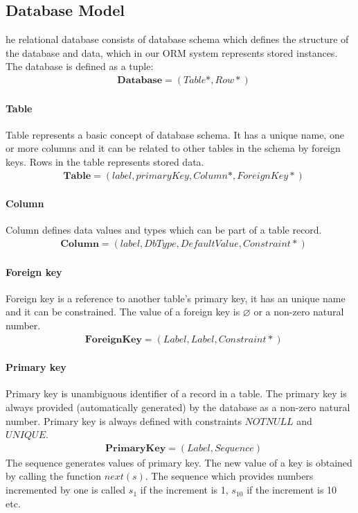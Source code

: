 \documentclass[11pt]{article}
\begin{document}
\subsection{Database Model}
he relational database consists of database schema which defines the structure of the database and data, which in our ORM system represents stored instances. The database is defined as a tuple:
\begin{align*}
&	\mathbf{Database} = ( Table*, Row* )
\end{align*}

\paragraph{Table} Table represents a basic concept of database schema. It has a unique name, one or more columns and it can be related to other tables in the schema by foreign keys. Rows in the table represents stored data.
\begin{align*}
&	\mathbf{Table} = (label, primaryKey, Column*, ForeignKey*)
\end{align*}

\paragraph{Column} Column defines data values and types which can be part of a table record.
\begin{align*}
&	\mathbf{Column} = (label, DbType, DefaultValue, Constraint*) 
\end{align*}

\paragraph{Foreign key} Foreign key is a reference to another table's primary key, it has an unique name and it can be constrained. The value of a foreign key is $\varnothing$ or a non-zero natural number.
\begin{align*}
&	\mathbf{ForeignKey} = (Label, Label, Constraint*) 
\end{align*}


\paragraph{Primary key} Primary key is unambiguous identifier of a record in a table. The primary key is always provided (automatically generated) by the database as a non-zero natural number. Primary key is always defined with constraints $NOTNULL$ and $UNIQUE$. 
\begin{align*}
&	\mathbf{PrimaryKey} =  ( Label, Sequence ) \end{align*}
The sequence generates values of primary key. The new value of a key is obtained by calling the function $next(s)$. The sequence which provides numbers incremented by one is called $s_1$ if the increment is 1, $s_{10}$ if the increment is 10 etc.
\end{document}
